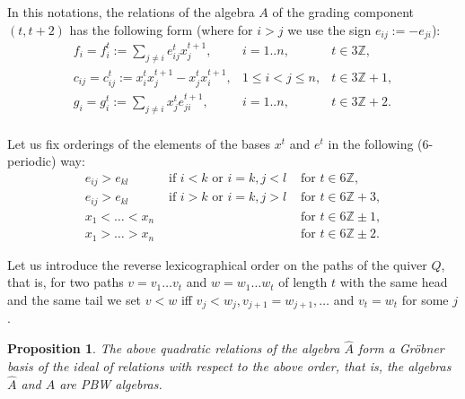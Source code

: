 \documentclass{amsart}
\numberwithin{equation}{section}
\theoremstyle{plain}
\newtheorem{prop}[theorem]{Proposition}
\theoremstyle{definition}
\begin{document}
In this notations, the relations of the algebra $A$ of the grading component
$(t,t+2)$ has the following form (where for $i>j$ we use the sign
$e_{ij}:=-e_{ji}$):
\begin{equation}
\label{eq:rel_A}
\begin{array}{lll}
f_i = f_i^t:= \sum\limits_{j \ne i} e_{ij}^t x_j^{t+1}, & i = 1..n, & t\in 3{\ensuremath{\mathbb Z}},\\
c_{ij} = c_{ij}^t:= x_i^t x_j^{t+1} - x_j^t x_i^{t+1}, & 1\le i <
j \le n, & t\in 3{\ensuremath{\mathbb Z}} +1 ,\\
g_i = g_i^t:= \sum\limits_{j \ne i} x_j^{t} e_{ji}^{t+1} , & i = 1..n, & t\in 3{\ensuremath{\mathbb Z}} +2.\\
\end{array}
\end{equation}

Let us fix orderings of the elements  of the bases $x^t$ and $e^t$
in the following (6-periodic) way:
$$
\begin{array}{lll}
    e_{ij}>e_{kl}  & \mbox{ if } i<k \mbox{ or  } i=k,j<l  & \mbox{ for } t \in
    6{\ensuremath{\mathbb Z}},\\
    e_{ij} > e_{kl}  & \mbox{ if } i>k \mbox{ or  } i=k,j>l  & \mbox{ for } t \in
    6{\ensuremath{\mathbb Z}} +3,\\
    x_{1}<\dots <x_n & &\mbox{ for } t \in
    6{\ensuremath{\mathbb Z}} \pm 1,\\
     x_{1}>\dots >x_n & &\mbox{ for } t \in
    6{\ensuremath{\mathbb Z}} \pm 2.
             \end{array}
$$

Let us introduce the reverse lexicographical order on the paths of
the quiver $Q$, that is, for two paths $v=v_1\dots v_t$ and
$w=w_1\dots w_t$ of length $t$ with  the same head and the
same tail we set $v<w$ iff $v_j<w_j , v_{j+1} = w_{j+1}, \dots $
and $ v_{t} = w_{t}$ for some $j$.

\begin{prop}
\label{prop: A is PBW}
The above quadratic relations of the algebra $\hat A$ form a
Gr\"obner basis of the ideal of relations with respect to the above
order, that is, the algebras
 $\hat A$ and $A$ are PBW algebras.
 \end{prop}
\end{document}
